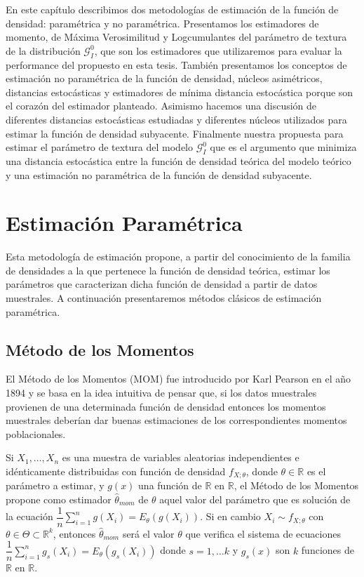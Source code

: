 En este capítulo describimos dos metodologías de estimación de la función de densidad: paramétrica y no paramétrica. Presentamos los estimadores de momento, de Máxima Verosimilitud y Logcumulantes del parámetro de textura de la distribución $\mathcal{G}_I^0$, que son los estimadores que utilizaremos para evaluar la performance del propuesto en esta tesis. También presentamos los conceptos de estimación no paramétrica de la función de densidad, núcleos asimétricos, distancias estocásticas y estimadores de mínima distancia estocástica porque son el corazón del estimador planteado.  Asimismo hacemos una discusión de diferentes distancias estocásticas estudiadas y diferentes núcleos utilizados para estimar la función de densidad subyacente. Finalmente nuestra propuesta para estimar el parámetro de textura del modelo $\mathcal{G}_I^0$ que es el argumento que minimiza una distancia estocástica entre la función de densidad teórica del modelo teórico y una estimación no paramétrica de la función de densidad subyacente. 


\section{Estimación Paramétrica}
\label{EstimacionParamétrica}

Esta metodología de estimación propone, a partir del conocimiento de la familia de densidades a la que pertenece la función de densidad teórica, estimar los parámetros que caracterizan dicha función de densidad a partir de datos muestrales. A continuación presentaremos métodos clásicos de estimación paramétrica.

\subsection{Método de los Momentos}
El Método de los Momentos (MOM) fue introducido por Karl Pearson en el año 1894 y se basa en la idea intuitiva de pensar que, si los datos muestrales provienen de una determinada función de densidad entonces los momentos muestrales deberían dar buenas estimaciones de los correspondientes momentos poblacionales. 

\begin{definition}
Si $X_1, \ldots, X_n$ es una muestra de variables aleatorias independientes e idénticamente distribuidas con función de densidad $f_{X;\theta}$, donde $\theta \in \mathbb{R}$ es el parámetro a estimar, y $g(x)$ una función de $\mathbb{R}$ en $\mathbb{R}$, el Método de los Momentos propone como estimador $\hat{\theta}_{mom}$ de $\theta$ aquel valor del parámetro que es solución de la ecuación  $\dfrac{1}{n} \sum_{i=1}^n g(X_i)=E_{\theta}(g(X_i)).$  
Si en cambio $X_i \sim f_{X;\theta}$ con $\theta \in \Theta \subset \mathbb{R}^k$, entonces $\hat{\theta}_{mom}$ será el valor $\theta$ que verifica el sistema de ecuaciones $\dfrac{1}{n} \sum_{i=1}^n g_s(X_i)=E_{\theta}(g_s(X_i))$ donde $s=1, \ldots k$ y $g_s(x)$ son $k$ funciones de $\mathbb{R}$ en $\mathbb{R}$.
\end{definition}


